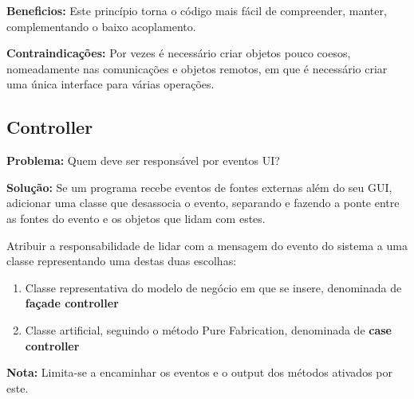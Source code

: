 \documentclass{article}
\begin{document}
\vspace{3mm}

\begin{flushleft}
    \textbf{Beneficios:} 
    Este princípio torna o código mais fácil de compreender, manter, complementando o
    baixo acoplamento.
\end{flushleft}

\begin{flushleft}
    \textbf{Contraindicações:} Por vezes é necessário criar objetos pouco coesos, nomeadamente nas
    comunicações e objetos remotos, em que é necessário criar uma única interface para
    várias operações.
\end{flushleft}

\pagebreak

\subsection{Controller}

\begin{flushleft}
    \textbf{Problema:} Quem deve ser responsável por eventos UI?

    \vspace{3mm}
    \textbf{Solução:} Se um programa recebe eventos de fontes externas além do seu GUI,
    adicionar uma classe que desassocia o evento, separando e fazendo a ponte entre as fontes
    do evento e os objetos que lidam com estes.
\end{flushleft}

Atribuir a responsabilidade de lidar com a mensagem do evento do sistema a uma classe
representando uma destas duas escolhas:

\begin{enumerate}
    \item Classe representativa do modelo de negócio em que se insere, denominada de
    \textbf{façade controller}
        \item Classe artificial, seguindo o método Pure Fabrication, denominada de \textbf{case
        controller}
\end{enumerate}

\begin{flushleft}
    \textbf{Nota:} Limita-se a encaminhar os eventos e o output dos métodos ativados por este.
\end{flushleft}
\end{document}
